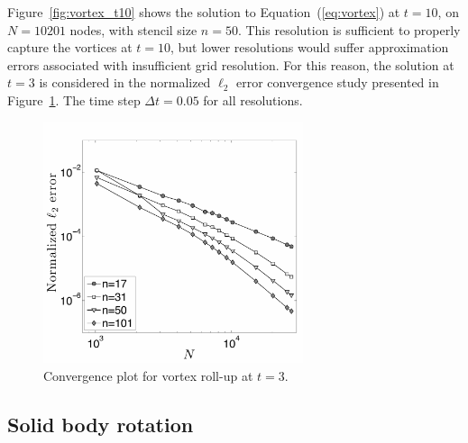 \documentclass{report}
\begin{document}
Figure~\ref{fig:vortex_t10} shows the solution to Equation~(\ref{eq:vortex}) at $t = 10$, on $N=10201$ nodes, with stencil size $n=50$. This resolution is sufficient to properly capture the vortices at $t=10$, but lower resolutions would suffer approximation errors associated with insufficient grid resolution. 
For this reason, the solution at $t=3$ is considered in the normalized $\ell_2$ error convergence study presented in Figure~\ref{fig:conv_plot_vortex_hv}. The time step $\Delta t = 0.05$ for all resolutions.

\begin{figure}[htbp!]
\begin{center}
\includegraphics[width=3in] {../figures/paper1/figures/vortex_rollup/convergence_plot_hv.pdf}
\caption{Convergence plot for vortex roll-up at $t=3$. }
\label{fig:conv_plot_vortex_hv}
\end{center}
\end{figure}


\subsection{Solid body rotation}
\end{document}
